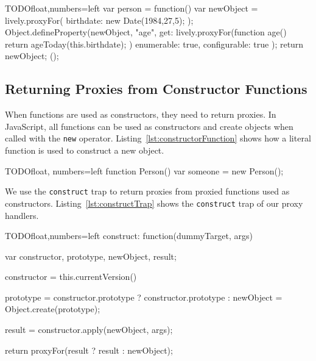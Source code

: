 \begin{code}{TODO}{float,numbers=left}
var person = function() {
    var newObject = lively.proxyFor({
        birthdate: new Date(1984,27,5);
    });
    Object.defineProperty(newObject, "age", {
        get: lively.proxyFor(function age() {
            return ageToday(this.birthdate);
        })
        enumerable: true,
        configurable: true
    });
    return newObject;
}();
\end{code}
\iffalse
\end{verbatim}\fi



\subsection{Returning Proxies from Constructor Functions} 

When functions are used as constructors, they need to return proxies.
In JavaScript, all functions can be used as constructors and create objects when called with the \lstinline{new} operator.
Listing~\ref{lst:constructorFunction} shows how a literal function is used to construct a new object.

\begin{code}{TODO}{float, numbers=left}
function Person() {}
var someone = new Person();
\end{code}
\iffalse
\end{verbatim}\fi

We use the \lstinline{construct} trap to return proxies from proxied functions used as constructors.
Listing~\ref{lst:constructTrap} shows the \lstinline{construct} trap of our proxy handlers.

\begin{code}{TODO}{float,numbers=left}
construct: function(dummyTarget, args) {
    var constructor, prototype, newObject, result;
    
    constructor = this.currentVersion()
    
    prototype = constructor.prototype ? constructor.prototype : {}    
    newObject = Object.create(prototype);
    
    result = constructor.apply(newObject, args);
    
    return proxyFor(result ? result : newObject);
}
\end{code}
\iffalse
\end{verbatim}\fi

